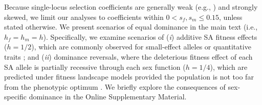 \documentclass[11pt]{article}
\begin{document}
Because single-locus selection coefficients are generally weak (e.g., \citealt{Eyre-WalkerKeightly2007}) and strongly skewed, we limit our analyses to coefficients within $0 < s_f,s_m \leq 0.15$, unless stated otherwise. We present scenarios of equal dominance in the main text (i.e., $h_f = h_m = h$). Specifically, we examine scenarios of ({\itshape i}) additive SA fitness effects ($h = 1/2$), which are commonly observed for small-effect alleles or quantitative traits \citep{AgrawalWhitlock2011}; and ({\itshape ii}) dominance reversals, where the deleterious fitness effect of each SA allele is partially recessive through each sex function ($h = 1/4$), which are predicted under fitness landscape models provided the population is not too far from the phenotypic optimum \citep{Manna2011, ConnallonClark2014}. We briefly explore the consequences of sex-specific dominance in the Online Supplementary Material.


\end{document}
